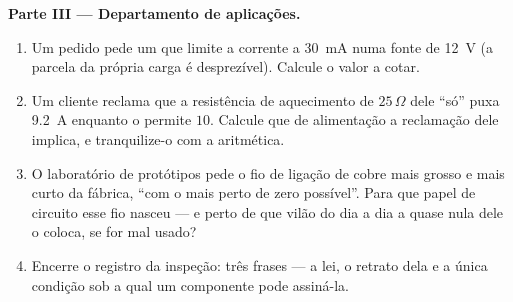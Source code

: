 \begin{problem}
\medskip\noindent\textbf{Parte III --- Departamento de aplicações.}
\begin{enumerate}[resume]
  \item Um pedido pede um  que limite a corrente a
        \qty{30}{mA} numa fonte de \qty{12}{V} (a parcela da própria
        carga é desprezível). Calcule o valor a cotar.
  \item Um cliente reclama que a resistência de aquecimento de
        $25\,\Omega$ dele ``só'' puxa \qty{9.2}{A} enquanto o 
        permite $10$. Calcule que  de alimentação a reclamação
        dele implica, e tranquilize-o com a aritmética.
  \item O laboratório de protótipos pede o fio de ligação de cobre
        mais grosso e mais curto da fábrica, ``com o mais perto de
        zero  possível''. Para que papel de circuito esse fio
        nasceu --- e perto de que vilão do dia a dia a 
        quase nula dele o coloca, se for mal usado?
  \item Encerre o registro da inspeção: três frases --- a lei, o
        retrato dela e a única condição sob a qual um componente pode
        assiná-la.
\end{enumerate}
\end{problem}
